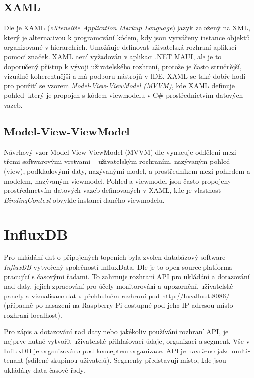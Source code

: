 \subsection{XAML}
Dle \cite{xaml} je XAML ({\it eXtensible Application Markup Language}) jazyk založený na XML, který je alternativou k programování kódem, kdy jsou vytvářeny instance objektů organizované v hierarchiích. Umožňuje definovat uživatelská rozhraní aplikací pomocí značek. XAML není vyžadován v aplikaci .NET MAUI, ale je to doporučený přístup k vývoji uživatelského rozhraní, protože je často stručnější, vizuálně koherentnější a má podporu nástrojů v IDE. XAML se také dobře hodí pro použití se vzorem {\it Model-View-ViewModel (MVVM)}, kde XAML definuje pohled, který je propojen s kódem viewmodelu v C\# prostřednictvím datových vazeb.

\subsection{Model-View-ViewModel}
Návrhový vzor Model-View-ViewModel (MVVM) dle \cite{mvvm} vynucuje oddělení mezi třemi softwarovými vrstvami – uživatelským rozhraním, nazývaným pohled (view), podkladovými daty, nazývanými model, a prostředníkem mezi pohledem a modelem, nazývaným viewmodel. Pohled a viewmodel jsou často propojeny prostřednictvím datových vazeb definovaných v XAML, kde je vlastnost {\it BindingContext} obvykle instancí daného viewmodelu.



\section{InfluxDB}
Pro ukládání dat o připojených topeních byla zvolen databázový software {\it InfluxDB} vytvořený společností InfluxData. Dle \cite{influx_gh} je to open-source platforma pracující s časovými řadami. To zahrnuje rozhraní API pro ukládání a dotazování nad daty, jejich zpracování pro účely monitorování a upozornění, uživatelské panely a vizualizace dat v přehledném rozhraní pod \url{http://localhost:8086/} (případně po nasazení na Raspberry Pi dostupné pod jeho IP adresou místo rozhraní localhost).

Pro zápis a dotazování nad daty nebo jakékoliv používání rozhraní API, je nejprve nutné vytvořit uživatelské přihlašovací údaje, organizaci a segment. Vše v InfluxDB je organizováno pod konceptem organizace. API je navrženo jako multi-tenant (sdílené skupinou uživatelů). Segmenty představují místo, kde jsou ukládány data časové řady.

